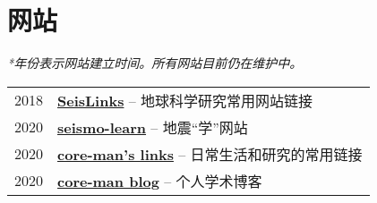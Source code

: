 \section*{网站}

\textit{*年份表示网站建立时间。所有网站目前仍在维护中。}

\begin{tabular}{p{} p{}}
2018 &	\textbf{\href{https://link.seisman.info/}{SeisLinks}} -- 地球科学研究常用网站链接 \\
2020 &	\textbf{\href{https://seismo-learn.org/}{seismo-learn}} -- 地震“学”网站 \\
2020 &	\textbf{\href{https://core-man.github.io/link/}{core-man's links}} -- 日常生活和研究的常用链接 \\
2020 &	\textbf{\href{https://core-man.github.io/blog/}{core-man blog}} -- 个人学术博客 \\
\end{tabular}
